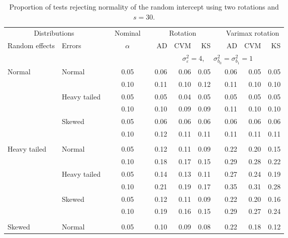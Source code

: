 \begin{table}[ht]
\centering
\caption{\label{tab:simb030}Proportion of tests rejecting normality of the random intercept using two rotations and $s = 30$.}
\begin{scriptsize}
\begin{tabular}{ll p{.1cm} c p{.1cm} rrr p{.1cm} rrr}
  \hline
  \multicolumn{2}{c}{Distributions}& & Nominal & &  \multicolumn{3}{c}{Rotation} & & \multicolumn{3}{c}{Varimax rotation} \\ \cline{1-2} \cline{6-8} \cline{10-12}   
  Random effects & Errors & & $\alpha$ & & AD & CVM & KS & & AD & CVM & KS \\ 
   \hline
& && && \multicolumn{7}{c}{$\sigma_{\varepsilon}^2 = 4$, \ \ $\sigma_{b_0}^2 = \sigma_{b_1}^2 = 1$} \\ \cline{6-12}
\rowcolor{gray!20}Normal       & Normal       && 0.05 &&  0.06 & 0.06 & 0.05 && 0.06 & 0.05 & 0.05 \\ 
\rowcolor{gray!20}             &              && 0.10 &&  0.11 & 0.10 & 0.12 && 0.11 & 0.10 & 0.10 \\ 
\rowcolor{gray!20}             & Heavy tailed && 0.05 &&  0.05 & 0.04 & 0.05 && 0.05 & 0.05 & 0.05 \\ 
\rowcolor{gray!20}             &              && 0.10 &&  0.10 & 0.09 & 0.09 && 0.11 & 0.10 & 0.10 \\ 
\rowcolor{gray!20}             & Skewed       && 0.05 &&  0.06 & 0.06 & 0.06 && 0.06 & 0.06 & 0.06 \\ 
\rowcolor{gray!20}             &              && 0.10 &&  0.12 & 0.11 & 0.11 && 0.11 & 0.11 & 0.11 \\ 
             &&&&&&&&&&&\\
Heavy tailed & Normal       && 0.05 &&  0.12 & 0.11 & 0.09 && 0.22 & 0.20 & 0.15 \\ 
             &              && 0.10 &&  0.18 & 0.17 & 0.15 && 0.29 & 0.28 & 0.22 \\ 
             & Heavy tailed && 0.05 &&  0.14 & 0.13 & 0.11 && 0.27 & 0.24 & 0.19 \\ 
             &              && 0.10 &&  0.21 & 0.19 & 0.17 && 0.35 & 0.31 & 0.28 \\ 
             & Skewed       && 0.05 &&  0.12 & 0.11 & 0.09 && 0.22 & 0.20 & 0.16 \\ 
             &              && 0.10 &&  0.19 & 0.16 & 0.15 && 0.29 & 0.27 & 0.24 \\ 
             &&&&&&&&&&&\\
Skewed       & Normal       && 0.05 &&  0.10 & 0.09 & 0.08 && 0.22 & 0.18 & 0.12 \\ 

\end{tabular}
\end{scriptsize}
\end{table}
